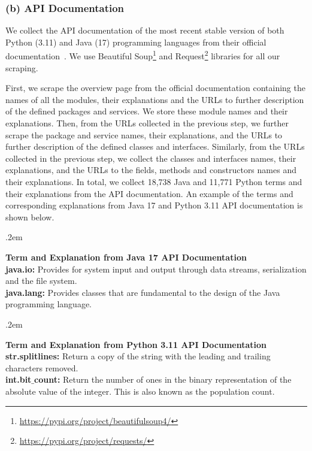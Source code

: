 \subsubsection{(b) API Documentation}
We collect the API documentation of the most recent stable version of both Python (3.11) and Java (17) programming languages from their official documentation~\cite{pythonDocumentation,javaDocumentation}. We use Beautiful Soup\footnote{\url{https://pypi.org/project/beautifulsoup4/}} and Request\footnote{\url{https://pypi.org/project/requests/}} libraries for all our scraping.\par
First, we scrape the overview page from the official documentation containing the names of all the modules, their explanations and the URLs to further description of the defined packages and services. We store these module names and their explanations. Then, from the URLs collected in the previous step, we further scrape the package and service names, their explanations, and the URLs to further description of the defined classes and interfaces. Similarly, from the URLs collected in the previous step, we collect the classes and interfaces names, their explanations, and the URLs to the fields, methods and constructors names and their explanations. In total, we collect 18,738 Java and 11,771 Python terms and their explanations from the API documentation. An example of the terms and corresponding explanations from Java 17 and Python 3.11 API documentation is shown below.\par 

\FrameSep.2em
\begin{frshaded}
\label{apitagjava}
\noindent
\textbf{Term and Explanation from Java 17 API Documentation}\\
\textbf{java.io:} Provides for system input and output through data streams,
 serialization and the file system.\\
\textbf{java.lang:} Provides classes that are fundamental to the design of the Java
 programming language.
 \end{frshaded}

\FrameSep.2em
\begin{frshaded}
\label{apitagpython}
\noindent
\textbf{Term and Explanation from Python 3.11 API Documentation}\\
\textbf{str.splitlines:} Return a copy of the string with the leading and trailing characters removed.\\
\textbf{int.bit$\_$count:} Return the number of ones in the binary representation of the absolute value of the integer. This is also known as the population count.
 \end{frshaded}


